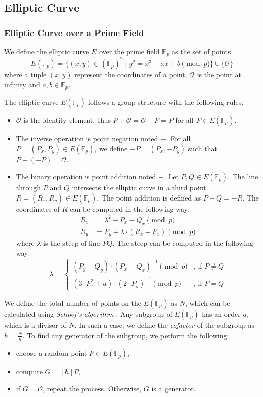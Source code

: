 \subsection{Elliptic Curve}


\subsubsection{Elliptic Curve over a Prime Field} \label{app: elliptic curve over a prime field}
We define the elliptic curve $E$ over the prime field $\mathbb{F}_p$ as the set of points
\[ E(\mathbb{F}_p) = \{ (x, y) \in (\mathbb{F}_p)^2 \mid y^2 = x^3 + ax + b \pmod p \} \cup \{ \mathcal{O} \} \]
where a tuple $(x, y)$ represent the coordinates of a point, $\mathcal{O}$ is the point at infinity and $a, b \in \mathbb{F}_p$.

The elliptic curve $E(\mathbb{F}_p)$ follows a group structure with the following rules:
\begin{itemize}
    \item $\mathcal{O}$ is the identity element, thus $P + \mathcal{O} = \mathcal{O} + P = P$ for all $P \in E(\mathbb{F}_p)$.
    \item The inverse operation is point negation noted $-$. For all $P = (P_x, P_y) \in E(\mathbb{F}_p)$, we define $-P = (P_x, -P_y)$ such that $P + (- P) = \mathcal{O}$.
    \item The binary operation is point addition noted $+$. Let $P, Q \in E(\mathbb{F}_p)$. The line through $P$ and $Q$ intersects the elliptic curve in a third point $R = (R_x, R_y) \in E(\mathbb{F}_p)$. The point addition is defined as $P + Q = -R$. The coordinates of $R$ can be computed in the following way:
    \begin{align*}
        R_x & = \lambda^2 - P_x - Q_x \pmod p \\
        R_y & = P_y + \lambda \cdot (R_x - P_x) \pmod p 
    \end{align*}
    where $\lambda$ is the steep of line $PQ$. The steep can be computed in the following way:
    \[ \lambda = 
    \begin{cases}
        (P_y - Q_y) \cdot (P_x - Q_x)^{-1} \pmod p  & \text{, if } P \neq Q \\
        (3 \cdot P_x^2 + a) \cdot (2 \cdot P_y)^{-1} \pmod{p} & \text{, if } P = Q
    \end{cases}
    \]
\end{itemize}

We define the total number of points on the $E(\mathbb{F}_p)$ as $N$, which can be calculated using \textit{Schoof's algorithm} \cite{Schoof85}. Any subgroup of $E(\mathbb{F}_p)$ has an order $q$, which is a divisor of $N$. In such a case, we define the \textit{cofactor} of the subgroup as $h = \frac{N}{q}$. To find any generator of the subgroup, we perform the following:
\begin{itemize}
    \item choose a random point $P \in E(\mathbb{F}_p)$,
    \item compute $G = [h]P$,
    \item if $G = \mathcal{O}$, repeat the process. Otherwise, $G$ is a generator.
\end{itemize}

